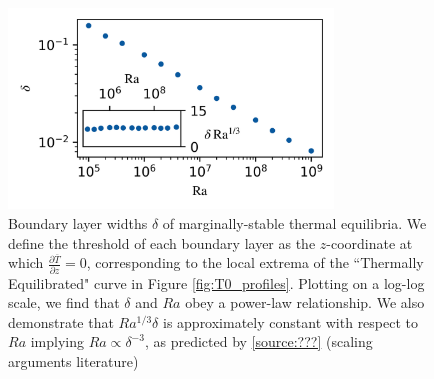 \documentclass[twocolumn,showpacs,amsmath,amssymb]{revtex4}
\def\bar{\overline}
\begin{document}
\begin{figure}[h]
    \centering
    \includegraphics[width=3.4in]{del_ra.PNG}
    \caption{Boundary layer widths $\delta$ of marginally-stable thermal equilibria. We define the threshold of each boundary layer as the $z$-coordinate at which $\frac{\partial \bar{T}}{\partial z} = 0$, corresponding to the local extrema of the ``Thermally Equilibrated" curve in Figure \ref{fig:T0_profiles}. Plotting on a log-log scale, we find that $\delta$ and $Ra$ obey a power-law relationship. We also demonstrate that $Ra^{1/3}\delta$ is approximately constant with respect to $Ra$ implying $Ra \propto  \delta^{-3}$, as predicted by \ref{source:???} (scaling arguments literature)}
    \label{fig:bl_ra}
\end{figure}
\end{document}
